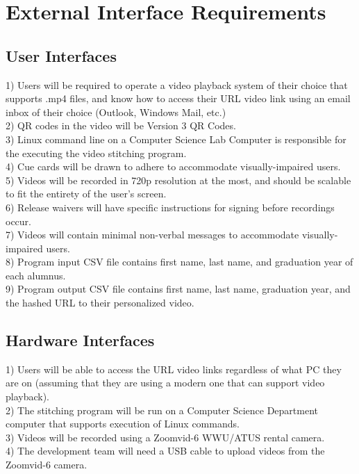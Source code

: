 \section{External Interface Requirements}

\subsection{User Interfaces}
1) Users will be required to operate a video playback system of their choice that supports .mp4 files, and know how
to access their URL video link using an email inbox of their choice (Outlook, Windows Mail, etc.)\\
2) QR codes in the video will be Version 3 QR Codes.\\
3) Linux command line on a Computer Science Lab Computer is responsible for the executing the video stitching program.\\
4) Cue cards will be drawn to adhere to accommodate visually-impaired users.\\
5) Videos will be recorded in 720p resolution at the most, and should be scalable to fit the entirety of the user's screen.\\
6) Release waivers will have specific instructions for signing before recordings occur.\\
7) Videos will contain minimal non-verbal messages to accommodate visually-impaired users.\\
8) Program input CSV file contains first name, last name, and graduation year of each alumnus.\\
9) Program output CSV file contains first name, last name, graduation year, and the hashed URL to their personalized video.\\

\subsection{Hardware Interfaces}

1) Users will be able to access the URL video links regardless of what PC they are on (assuming that they are using a modern one that
can support video playback).\\
2) The stitching program will be run on a Computer Science Department computer that supports execution of Linux commands.\\
3) Videos will be recorded using a Zoomvid-6 WWU/ATUS rental camera.\\
4) The development team will need a USB cable to upload videos from the Zoomvid-6 camera.\\
\
